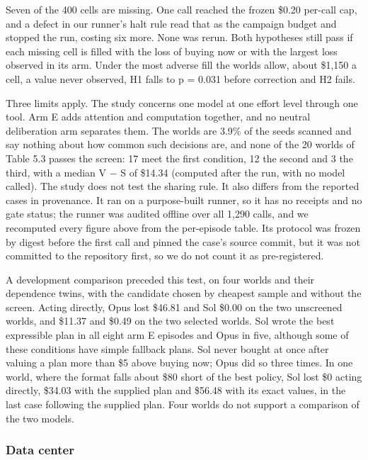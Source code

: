 Seven of the 400 cells are missing. One call reached the frozen \$0.20 per-call cap, and a defect in our runner's halt
rule read that as the campaign budget and stopped the run, costing six more. None was rerun. Both hypotheses still
pass if each missing cell is filled with the loss of buying now or with the largest loss observed in its arm. Under the
most adverse fill the worlds allow, about \$1,150 a cell, a value never observed, H1 falls to p = 0.031 before correction
and H2 fails.

Three limits apply. The study concerns one model at one effort level through one tool. Arm E adds attention and
computation together, and no neutral deliberation arm separates them. The worlds are 3.9\% of the seeds scanned and say
nothing about how common such decisions are, and none of the 20 worlds of Table 5.3 passes the screen: 17 meet the
first condition, 12 the second and 3 the third, with a median V − S of \$14.34 (computed after the run, with no model
called). The study does not test the sharing rule. It also differs from the
reported cases in provenance. It ran on a purpose-built runner, so it has no receipts and no gate status; the runner
was audited offline over all 1,290 calls, and we recomputed every figure above from the per-episode table. Its
protocol was frozen by digest before the first call and pinned the case's source commit, but it was not committed to
the repository first, so we do not count it as pre-registered.

A development comparison preceded this test, on four worlds and their dependence twins, with the candidate chosen by
cheapest sample and without the screen. Acting directly, Opus lost \$46.81 and Sol \$0.00 on the two unscreened worlds,
and \$11.37 and \$0.49 on the two selected worlds. Sol wrote the best expressible plan in all eight arm E episodes and
Opus in five, although some of these conditions have simple fallback plans. Sol never bought at once after valuing a
plan more than \$5 above buying now; Opus did so three times. In one world, where the format falls about \$80 short of the best policy, Sol lost \$0 acting directly,
\$34.03 with the supplied plan and \$56.48 with its exact values, in the last case following the supplied plan.
Four worlds do not support a comparison of the two models.

\subsubsection{Data center}\label{data-center}

